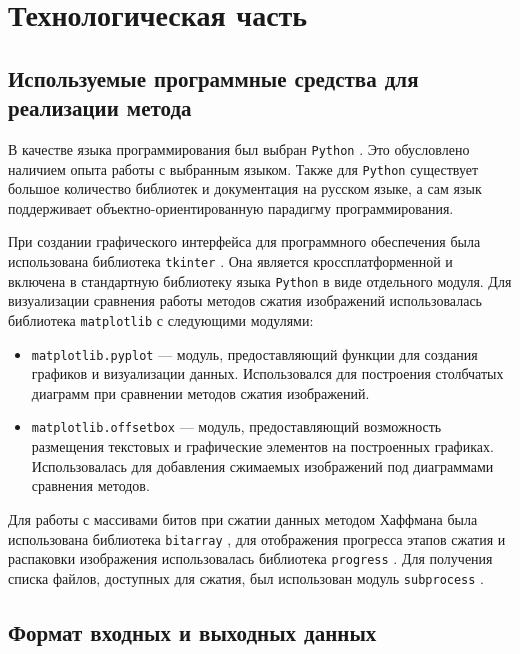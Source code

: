 \chapter{Технологическая часть}

\section{Используемые программные средства для реализации метода}

В качестве языка программирования был выбран \texttt{Python} \cite{Python}. Это обусловлено наличием опыта работы с выбранным языком. Также для \texttt{Python} существует большое количество библиотек и документация на русском языке, а сам язык поддерживает объектно-ориентированную парадигму программирования.

При создании графического интерфейса для программного обеспечения была использована библиотека \texttt{tkinter} \cite{Tkinter}. Она является кроссплатформенной и включена в стандартную библиотеку языка \texttt{Python} в виде отдельного модуля. Для визуализации сравнения работы методов сжатия изображений использовалась библиотека \texttt{matplotlib} \cite{Matplotlib} с следующими модулями:
\begin{itemize}
    \item \texttt{matplotlib.pyplot} \cite{Pyplot} --- модуль, предоставляющий функции для создания графиков и визуализации данных. Использовался для построения столбчатых диаграмм при сравнении методов сжатия изображений.
    \item \texttt{matplotlib.offsetbox} \cite{OffsetBox} --- модуль, предоставляющий возможность размещения текстовых и графические элементов на построенных графиках. Использовалась для добавления сжимаемых изображений под диаграммами сравнения методов.
\end{itemize}

Для работы с массивами битов при сжатии данных методом Хаффмана была использована библиотека \texttt{bitarray} \cite{Bitarray}, для отображения прогресса этапов сжатия и распаковки изображения использовалась библиотека \texttt{progress} \cite{Progress}. Для получения списка файлов, доступных для сжатия, был использован модуль \texttt{subprocess} \cite{Subprocess}.


\section{Формат входных и выходных данных}

